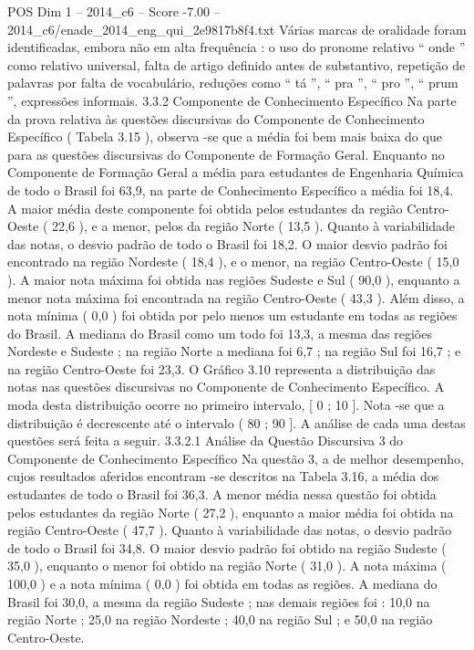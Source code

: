 \begin{textsample}{POS Dim 1 – 2014\_c6 – Score -7.00 – 2014\_c6/enade\_2014\_eng\_qui\_2e9817b8f4.txt}
Várias marcas de oralidade foram identificadas, embora não em alta frequência : o uso do pronome relativo “ onde ” como relativo universal, falta de artigo definido antes de substantivo, repetição de palavras por falta de vocabulário, reduções como “ tá ”, “ pra ”, “ pro ”, “ prum ”, expressões informais. 3.3.2 Componente de Conhecimento Específico Na parte da prova relativa às questões discursivas do Componente de Conhecimento Específico ( Tabela 3.15 ), observa -se que a média foi bem mais baixa do que para as questões discursivas do Componente de Formação Geral.
Enquanto no Componente de Formação Geral a média para estudantes de Engenharia Química de todo o Brasil foi 63,9, na parte de Conhecimento Específico a média foi 18,4.
A maior média deste componente foi obtida pelos estudantes da região Centro-Oeste ( 22,6 ), e a menor, pelos da região Norte ( 13,5 ).
Quanto à variabilidade das notas, o desvio padrão de todo o Brasil foi 18,2.
O maior desvio padrão foi encontrado na região Nordeste ( 18,4 ), e o menor, na região Centro-Oeste ( 15,0 ).
A maior nota máxima foi obtida nas regiões Sudeste e Sul ( 90,0 ), enquanto a menor nota máxima foi encontrada na região Centro-Oeste ( 43,3 ).
Além disso, a nota mínima ( 0,0 ) foi obtida por pelo menos um estudante em todas as regiões do Brasil.
A mediana do Brasil como um todo foi 13,3, a mesma das regiões Nordeste e Sudeste ; na região Norte a mediana foi 6,7 ; na região Sul foi 16,7 ; e na região Centro-Oeste foi 23,3.
O Gráfico 3.10 representa a distribuição das notas nas questões discursivas no Componente de Conhecimento Específico.
A moda desta distribuição ocorre no primeiro intervalo, [ 0 ; 10 ].
Nota -se que a distribuição é decrescente até o intervalo ( 80 ; 90 ].
A análise de cada uma destas questões será feita a seguir. 3.3.2.1 Análise da Questão Discursiva 3 do Componente de Conhecimento Específico Na questão 3, a de melhor desempenho, cujos resultados aferidos encontram -se descritos na Tabela 3.16, a média dos estudantes de todo o Brasil foi 36,3.
A menor média nessa questão foi obtida pelos estudantes da região Norte ( 27,2 ), enquanto a maior média foi obtida na região Centro-Oeste ( 47,7 ).
Quanto à variabilidade das notas, o desvio padrão de todo o Brasil foi 34,8.
O maior desvio padrão foi obtido na região Sudeste ( 35,0 ), enquanto o menor foi obtido na região Norte ( 31,0 ).
A nota máxima ( 100,0 ) e a nota mínima ( 0,0 ) foi obtida em todas as regiões.
A mediana do Brasil foi 30,0, a mesma da região Sudeste ; nas demais regiões foi : 10,0 na região Norte ; 25,0 na região Nordeste ; 40,0 na região Sul ; e 50,0 na região Centro-Oeste.

\end{textsample}
